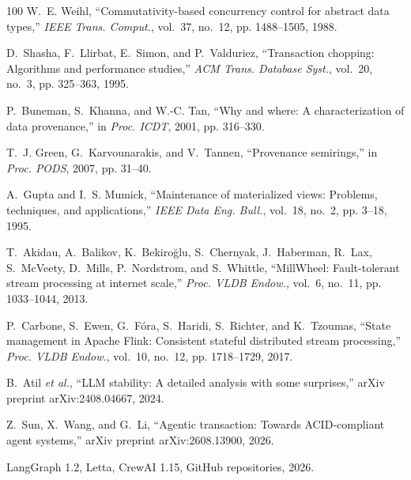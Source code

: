 \begin{thebibliography}{100}
W.~E. Weihl, ``Commutativity-based concurrency control for abstract data types,'' \emph{IEEE Trans. Comput.}, vol.~37, no.~12, pp. 1488--1505, 1988.

D.~Shasha, F.~Llirbat, E.~Simon, and P.~Valduriez, ``Transaction chopping: Algorithms and performance studies,'' \emph{ACM Trans. Database Syst.}, vol.~20, no.~3, pp. 325--363, 1995.

P.~Buneman, S.~Khanna, and W.-C. Tan, ``Why and where: A characterization of data provenance,'' in \emph{Proc. ICDT}, 2001, pp. 316--330.

T.~J. Green, G.~Karvounarakis, and V.~Tannen, ``Provenance semirings,'' in \emph{Proc. PODS}, 2007, pp. 31--40.

A.~Gupta and I.~S. Mumick, ``Maintenance of materialized views: Problems, techniques, and applications,'' \emph{IEEE Data Eng. Bull.}, vol.~18, no.~2, pp. 3--18, 1995.

T.~Akidau, A.~Balikov, K.~Bekiro\u{g}lu, S.~Chernyak, J.~Haberman, R.~Lax, S.~McVeety, D.~Mills, P.~Nordstrom, and S.~Whittle, ``{MillWheel}: Fault-tolerant stream processing at internet scale,'' \emph{Proc. VLDB Endow.}, vol.~6, no.~11, pp. 1033--1044, 2013.

P.~Carbone, S.~Ewen, G.~F\'ora, S.~Haridi, S.~Richter, and K.~Tzoumas, ``State management in {Apache Flink}: Consistent stateful distributed stream processing,'' \emph{Proc. VLDB Endow.}, vol.~10, no.~12, pp. 1718--1729, 2017.

B.~Atil \emph{et al.}, ``{LLM} stability: A detailed analysis with some surprises,'' arXiv preprint arXiv:2408.04667, 2024.

Z.~Sun, X.~Wang, and G.~Li, ``Agentic transaction: Towards {ACID}-compliant agent systems,'' arXiv preprint arXiv:2608.13900, 2026.

{LangGraph} 1.2, {Letta}, {CrewAI} 1.15, GitHub repositories, 2026.

\end{thebibliography}
